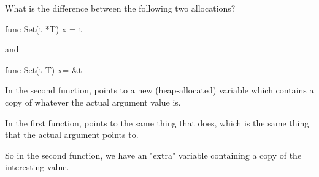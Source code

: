 \begin{Exercise}[title={Pointers},difficulty=6]
\label{ex:pointers}
\Question
What is the difference between the following two allocations?
\begin{lstinline}
func Set(t *T) {
    x = t
}
\end{lstinline}
and
\begin{lstinline}
func Set(t T) {
    x= &t
}
\end{lstinline}

\end{Exercise}

\begin{Answer}
\Question
In the second function,  points to a new
(heap-allocated) variable  which contains
a copy of whatever the actual argument value is.

In the first function,  points to the same thing
that  does, which is the same thing that the actual
argument points to.

So in the second function, we have an "extra" variable
containing a copy of the interesting value.
\end{Answer}
